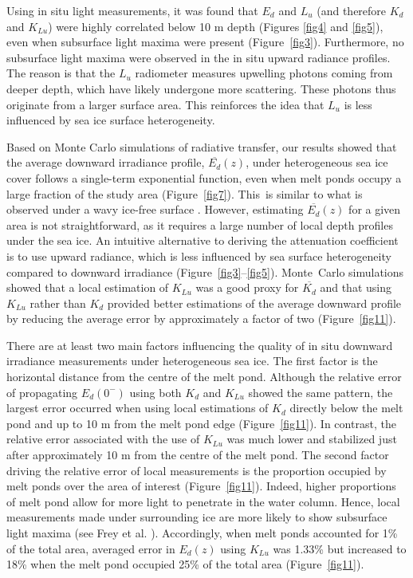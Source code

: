 \documentclass[applsci,article,accept,moreauthors,pdftex,10pt,a4paper]{Definitions/mdpi}
\newcommand{\ked}{\ensuremath{K_{d}}}
\newcommand{\klu}{\ensuremath{K_{Lu}}}
\newcommand{\edz}{\ensuremath{{E_d(z)}}}
\newcommand{\ed}{\ensuremath{{E_d}}}
\newcommand{\lu}{\ensuremath{{L_u}}}
\newcommand{\edzero}{\ensuremath{{E_d(0^-)}}}
\newcommand{\meanedz}{\ensuremath{{\overline{E_d}(z)}}}
\newcommand{\meanked}{\ensuremath{{\overline{K_{d}}}}}
\begin{document}
Using in situ light measurements, it was found that \ed{} and \lu{} (and therefore \ked{} and \klu{}) were highly correlated below 10 m depth (Figures \ref{fig4} and \ref{fig5}), even when subsurface light maxima were present (Figure~\ref{fig3}). Furthermore, no subsurface light maxima were observed in the in situ upward radiance profiles. The reason is that the \lu{} radiometer measures upwelling photons coming from deeper depth, which have likely undergone more scattering.  These photons thus originate from a larger surface area. This reinforces the idea that \lu{} is less influenced by sea ice surface heterogeneity. 

Based on Monte Carlo simulations of radiative transfer, our results showed that the average downward irradiance profile, \meanedz{}, under heterogeneous sea ice cover follows a single-term exponential function, even when melt ponds occupy a large fraction of the study area (Figure~\ref{fig7}). This~is similar to what is observed under a wavy ice-free surface \citep{Zaneveld2001}. However, estimating \meanedz{} for a given area is not straightforward, as it requires a large number of local depth profiles under the sea ice. An intuitive alternative to deriving the attenuation coefficient is to use upward radiance, which is less influenced by sea surface heterogeneity compared to downward irradiance (Figure~\ref{fig3}--\ref{fig5}). Monte~Carlo simulations showed that a local estimation of \klu{} was a good proxy for \meanked{} and that using \klu{} rather than \ked{} provided better estimations of the average downward profile by reducing the average error by approximately a factor of two (Figure~\ref{fig11}). 

There are at least two main factors influencing the quality of in situ downward irradiance measurements under heterogeneous sea ice. The first factor is the horizontal distance from the centre of the melt pond. Although the relative error of propagating \edzero{} using both \ked{} and \klu{} showed the same pattern, the largest error occurred when using local estimations of \ked{} directly below the melt pond and up to 10 m from the melt pond edge (Figure~\ref{fig11}). In contrast, the relative error associated with the use of \klu{} was much lower and stabilized just after approximately 10 m from the centre of the melt pond. The second factor driving the relative error of local measurements is the proportion occupied by melt ponds over the area of interest (Figure~\ref{fig11}). Indeed, higher proportions of melt pond allow for more light to penetrate in the water column. Hence, local measurements made under surrounding ice are more likely to show subsurface light maxima (see Frey et al. \cite{Frey2011}). Accordingly, when melt ponds accounted for 1\% of the total area, averaged error in \edz{} using \klu{} was 1.33\% but increased to 18\% when the melt pond occupied 25\% of the total area (Figure~\ref{fig11}).
\end{document}
